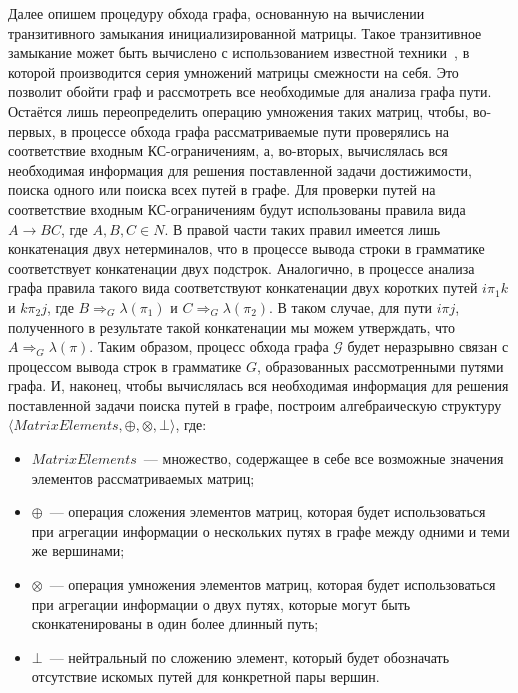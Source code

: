 Далее опишем процедуру обхода графа, основанную на вычислении транзитивного замыкания инициализированной матрицы. Такое транзитивное замыкание может быть вычислено с использованием известной техники~\cite{baras2010path}, в которой производится серия умножений матрицы смежности на себя. Это позволит обойти граф и рассмотреть все необходимые для анализа графа пути. Остаётся лишь переопределить операцию умножения таких матриц, чтобы, во-первых, в процессе обхода графа рассматриваемые пути проверялись на соответствие входным КС-ограничениям, а, во-вторых, вычислялась вся необходимая информация для решения поставленной задачи достижимости, поиска одного или поиска всех путей в графе. Для проверки путей на соответствие входным КС-ограничениям будут использованы правила вида $A \rightarrow B C$, где $A, B, C \in N$. В правой части таких правил имеется лишь конкатенация двух нетерминалов, что в процессе вывода строки в грамматике соответствует конкатенации двух подстрок. Аналогично, в процессе анализа графа правила такого вида соответствуют конкатенации двух коротких путей $i \pi_1 k$ и $k \pi_2 j$, где $B \Rightarrow_G \lambda(\pi_1)$ и $C \Rightarrow_G \lambda(\pi_2)$. В таком случае, для пути $i\pi j$, полученного в результате такой конкатенации мы можем утверждать, что $A \Rightarrow_G \lambda(\pi)$. Таким образом, процесс обхода графа $\mathcal{G}$ будет неразрывно связан с процессом вывода строк в грамматике $G$, образованных рассмотренными путями графа. И, наконец, чтобы вычислялась вся необходимая информация для решения поставленной задачи поиска путей в графе, построим алгебраическую структуру $\langle \textit{MatrixElements}, \oplus, \otimes, \bot \rangle$, где:
\begin{itemize}
    \item $\textit{MatrixElements}$~--- множество, содержащее в себе все возможные значения элементов рассматриваемых матриц;
    \item $\oplus$~--- операция сложения элементов матриц, которая будет использоваться при агрегации информации о нескольких путях в графе между одними и теми же вершинами;
    \item $\otimes$~--- операция умножения элементов матриц, которая будет использоваться при агрегации информации о двух путях, которые могут быть сконкатенированы в один более длинный путь;
    \item $\bot$~--- нейтральный по сложению элемент, который будет обозначать отсутствие искомых путей для конкретной пары вершин.
\end{itemize}

